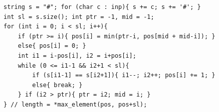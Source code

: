 \begin{verbatim}
string s = "#"; for (char c : inp){ s += c; s += '#'; }
int sl = s.size(); int ptr = -1, mid = -1;
for (int i = 0; i < sl; i++){
	if (ptr >= i){ pos[i] = min(ptr-i, pos[mid + mid-i]); }
	else{ pos[i] = 0; }
	int i1 = i-pos[i], i2 = i+pos[i];
	while (0 <= i1-1 && i2+1 < sl){
		if (s[i1-1] == s[i2+1]){ i1--; i2++; pos[i] += 1; }
		else{ break; }
	} if (i2 > ptr){ ptr = i2; mid = i; }
} // length = *max_element(pos, pos+sl);
\end{verbatim}